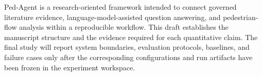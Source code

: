 Ped-Agent is a research-oriented framework intended to connect governed literature evidence, language-model-assisted question answering, and pedestrian-flow analysis within a reproducible workflow. This draft establishes the manuscript structure and the evidence required for each quantitative claim. The final study will report system boundaries, evaluation protocols, baselines, and failure cases only after the corresponding configurations and run artifacts have been frozen in the experiment workspace.
